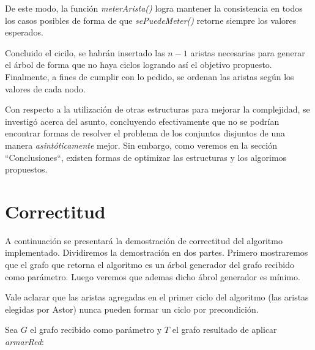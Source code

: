 \documentclass[a4paper,11pt] {article}
\begin{document}
De este modo, la función \textit{meterArista()} logra mantener la consistencia en todos los casos posibles de forma de que \textit{sePuedeMeter()} retorne siempre los valores esperados.

Concluido el cicilo, se habrán insertado las $n-1$ aristas necesarias para generar el árbol de forma que no haya ciclos logrando así el objetivo propuesto. Finalmente, a fines de cumplir con lo pedido, se ordenan las aristas según los valores de cada nodo.

Con respecto a la utilización de otras estructuras para mejorar la complejidad, se investigó acerca del asunto, concluyendo efectivamente que no se podrían encontrar formas de resolver el problema de los conjuntos disjuntos de una manera \textit{asintóticamente} mejor. Sin embargo, como veremos en la sección ``Conclusiones``, existen formas de optimizar las estructuras y los algorimos propuestos.

\section*{Correctitud}

A continuaci\'on se presentar\'a la demostraci\'on de correctitud del algoritmo implementado. Dividiremos la demostraci\'on en dos partes. Primero mostraremos que el grafo que retorna el algoritmo es un \'arbol generador del grafo recibido como par\'ametro. Luego veremos que ademas dicho \'abrol generador es m\'inimo.

Vale aclarar que las aristas agregadas en el primer ciclo del algoritmo (las aristas elegidas por Astor) nunca pueden formar un ciclo por precondici\'on.

Sea $G$ el grafo recibido como par\'ametro y $T$ el grafo resultado de aplicar \textit{armarRed}:
\end{document}
